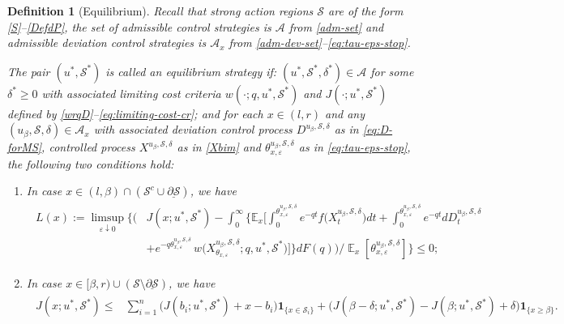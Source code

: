 \documentclass[11pt]{article} %
\newtheorem{definition}[theorem]{Definition}
\DeclareMathOperator{\E}{\mathbb E}
\numberwithin{komcounter}{section}
\renewcommand{\ul}{\underline}
\renewcommand{\epsilon}{\varepsilon}
\begin{document}
\begin{definition}[Equilibrium]
\label{def:equ_stop_time} 
Recall that strong action regions $\mathcal{S}$ are of the form \eqref{S}--\eqref{DefdP}, 
the set of admissible control strategies is $\mathcal{A}$ from \eqref{adm-set} and admissible deviation control strategies is $\mathcal{A}_{x}$ from \eqref{adm-dev-set}--\eqref{eq:tau-eps-stop}. 

The pair $(u^*,\mathcal{S}^*)$ is called an equilibrium strategy if: 
$(u^*,\mathcal{S}^*,\delta^*) \in \mathcal{A}$ for some $\delta^*\geq 0$ with associated limiting cost criteria 
$w(\cdot;q,u^*,\mathcal{S}^*)$ and $J(\cdot; u^*,\mathcal{S}^*)$ defined by \eqref{wrqD}--\eqref{eq:limiting-cost-cr};
and for each $x\in(l,r)$ and any $(u_\beta, \mathcal{S}, \delta)\in \mathcal{A}_{x}$ with associated deviation control process $D^{u_\beta,\mathcal{S},\delta}$ as in \eqref{eq:D-forMS},  controlled process $X^{u_\beta,\mathcal{S},\delta}$ as in \eqref{Xbim} and $\theta^{u_\beta,\mathcal{S},\delta}_{x,\epsilon}$ as in \eqref{eq:tau-eps-stop}, 
the following two conditions hold: 
\begin{enumerate}[\rm (i)]
\vspace{-2mm}
\item In case 
$x \in (l,\beta) \cap (\mathcal{S}^c \cup \ul{\partial \mathcal{S}})$, we have 
\begin{align}\label{EQ1}
\begin{split}
L(x):=
\limsup_{\epsilon \downarrow 0} 
\bigg\{ \bigg( &J(x; u^*, \mathcal{S}^*) - \int_0^\infty \bigg\{ 
\mathbb{E}_x \bigg[ \int_{0}^{\theta^{u_\beta,\mathcal{S},\delta}_{x,\epsilon}} e^{-qt} f\big( X_t^{u_\beta,\mathcal{S},\delta} \big) dt + \int_{0}^{\theta^{u_\beta,\mathcal{S},\delta}_{x,\epsilon}} e^{-qt} d D^{u_\beta,\mathcal{S},\delta}_t  \\
&+ e^{-q \theta^{u_\beta,\mathcal{S},\delta}_{x,\epsilon}} \, w\Big( X^{u_\beta,\mathcal{S},\delta}_{\theta_{x,\epsilon}};q, u^*, \mathcal{S}^* \Big)\bigg] \bigg\} dF(q) \bigg) \bigg/ \E_x\left[\theta^{u_\beta,\mathcal{S},\delta}_{x,\epsilon} \right] \bigg\}
\leq 0;
\end{split}
\end{align}

\vspace{-2mm}
\item In case $x \in [\beta,r) \cup (\mathcal{S} \setminus \ul{\partial \mathcal{S}})$, we have
\begin{align}\label{EQ2}
\begin{split}
J(x; u^*, \mathcal{S}^*) \leq 
& \sum_{i=1}^{n} \big( J(b_i; u^*, \mathcal{S}^*) + x -  b_i \big) \mathbf{1}_{\{x \in \mathcal{S}_i\}} 
+ \big( J(\beta-\delta; u^*, \mathcal{S}^*) - J(\beta; u^*, \mathcal{S}^*) 
+ \delta \big) \mathbf{1}_{\{x \geq \beta\}}.
\end{split}
\end{align}
\end{enumerate}
\end{definition}
\end{document}
